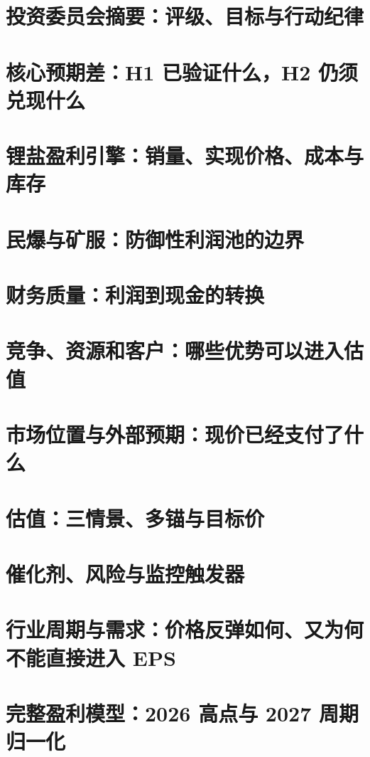 \documentclass[a4paper,11pt,openany,fontset=none]{ctexrep}
\begin{document}
\astockcover
{\footnotesize\tableofcontents}
\clearpage

\chapter{投资委员会摘要：评级、目标与行动纪律}

\chapter{核心预期差：H1 已验证什么，H2 仍须兑现什么}

\chapter{锂盐盈利引擎：销量、实现价格、成本与库存}

\chapter{民爆与矿服：防御性利润池的边界}

\chapter{财务质量：利润到现金的转换}

\chapter{竞争、资源和客户：哪些优势可以进入估值}

\chapter{市场位置与外部预期：现价已经支付了什么}

\chapter{估值：三情景、多锚与目标价}

\chapter{催化剂、风险与监控触发器}

\chapter{行业周期与需求：价格反弹如何、又为何不能直接进入 EPS}

\chapter{完整盈利模型：2026 高点与 2027 周期归一化}

\end{document}
